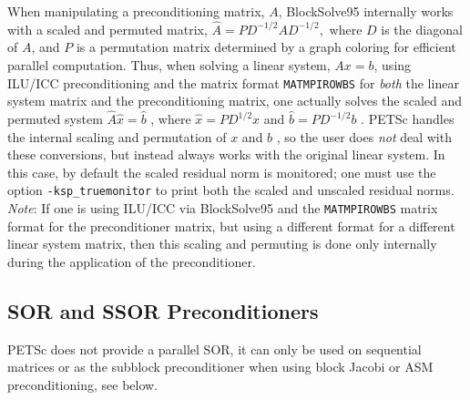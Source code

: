 When manipulating a preconditioning matrix, $ A $, BlockSolve95
internally works with a scaled and permuted matrix, $ \hat{A} = P
D^{-1/2} A D^{-1/2},$ where $ D $ is the diagonal of $ A $, and $ P $ is a
permutation matrix determined by a graph coloring for efficient
parallel computation.  Thus, when solving a linear system, $ Ax=b $,
using ILU/ICC preconditioning and the matrix format {\tt MATMPIROWBS}
for {\em both} the linear system matrix and the preconditioning
matrix, one actually solves the scaled and permuted system $ \hat{A}
\hat{x} = \hat{b} $ , where $ \hat{x} = P D^{1/2} x $ and $\hat{b} = P
D^{-1/2} b$ .  PETSc handles the internal scaling and permutation of
$ x $ and $ b $ , so the user does {\em not} deal with these conversions, 
but instead always works with the original linear system.  In
this case, by default the scaled residual norm is monitored; one must use the
option {\tt -ksp\_truemonitor}  to print both the
scaled and unscaled residual norms. {\em Note}: If one is using ILU/ICC via
BlockSolve95 and the {\tt MATMPIROWBS} matrix format for the 
preconditioner matrix, but using a different format for a different
linear system matrix, then this scaling and permuting is done only
internally during the application of the preconditioner.



\subsection{SOR and SSOR Preconditioners}

PETSc does not provide a parallel SOR, it can only be used on sequential 
matrices or as the subblock preconditioner when using block Jacobi or 
ASM preconditioning, see below.

